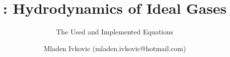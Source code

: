 
\usepackage{rotating}



\title{: Hydrodynamics of Ideal Gases}
\subtitle{The Used and Implemented Equations}
\author{Mladen Ivkovic (mladen.ivkovic@hotmail.com)}
\date{}









	



\maketitle
\newpage
\tableofcontents
\newpage




























\newpage









